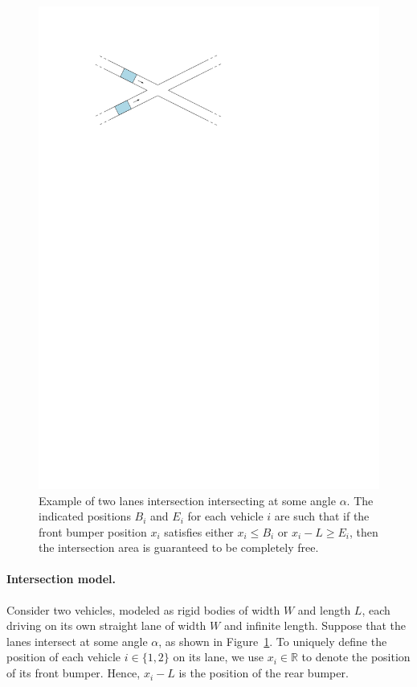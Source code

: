 \documentclass[a4paper]{report}
\theoremstyle{definition}
\theoremstyle{plain}
\begin{document}
\begin{figure}
  \centering
  \includegraphics[scale=1]{figures/intersection-non-axis-aligned}
  \caption{Example of two lanes intersection intersecting at some angle
    $\alpha$. The indicated positions $B_{i}$ and $E_{i}$ for each vehicle $i$
    are such that if the front bumper position $x_{i}$ satisfies either
    $x_{i} \leq B_{i}$ or $x_{i} - L \geq E_{i}$, then the intersection area is
    guaranteed to be completely free.}%
  \label{fig:intersection-non-axis-aligned}
\end{figure}

\paragraph{Intersection model.}

Consider two vehicles, modeled as rigid bodies of width $W$ and length $L$, each
driving on its own straight lane of width $W$ and infinite length.
%
Suppose that the lanes intersect at some angle $\alpha$, as shown in
Figure~\ref{fig:intersection-non-axis-aligned}.
%
To uniquely define the position of each vehicle $i \in \{1, 2\}$ on its lane, we
use $x_{i} \in \mathbb{R}$ to denote the position of its front bumper. Hence,
$x_{i} - L$ is the position of the rear bumper.
\end{document}
